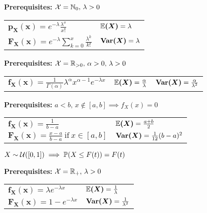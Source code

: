 \begin{ddefinition*}
  \textbf{Prerequisites:} \(\operatorname{\mathcal{X}} = \mathbb{N}_0, \, \lambda > 0\) \\
  \begin{tabularx}{\linewidth}{@{}ll@{}}
    \(\bm{p_X(x)} = e^{-\lambda}\frac{\lambda^x}{x!}\) & \(\bm{\mathbb{E}(X)} = \lambda\) \\
    \(\bm{F_X(x)} = e^{-\lambda} \sum\limits_{k=0}^x \frac{\lambda^k}{k!}\) & \(\bm{\Var(X)} = \lambda\)
  \end{tabularx}
\end{ddefinition*}

\begin{cdefinition*}
  \textbf{Prerequisites:} \(\operatorname{\mathcal{X}} = \mathbb{R}_{>0}, \, \alpha > 0, \, \lambda > 0\) \\
  \begin{tabularx}{\linewidth}{@{}lll@{}}
    \(\bm{f_X(x)} = \frac{1}{\Gamma(\alpha)} \lambda^\alpha x^{\alpha - 1}e^{-\lambda x}\) & \(\bm{\mathbb{E}(X)} = \frac{\alpha}{\lambda}\) & \(\bm{\Var(X)} = \frac{\alpha}{\lambda^2}\)
  \end{tabularx}
\end{cdefinition*}

\begin{cdefinition*}
  \textbf{Prerequisites:} \(a < b, \, x \notin [a, b] \implies f_X(x) = 0\) \\
  \begin{tabularx}{\linewidth}{@{}ll@{}}
    \(\bm{f_X(x)} = \frac{1}{b-a}\) & \(\bm{\mathbb{E}(X)} = \frac{a + b}{2}\) \\
    \(\bm{F_X(x)} = \frac{x - a}{b - a} \ \text{if} \ x \in [a, b]\) & \(\bm{\Var(X)} = \frac{1}{12}(b - a)^2\)
  \end{tabularx}
\end{cdefinition*}

\begin{lemma}
  \(X \sim \operatorname{\mathcal{U}}([0, 1]) \implies \mathbb{P}(X \leq F(t)) = F(t)\)
\end{lemma}

\begin{cdefinition*}
  \textbf{Prerequisites:} \(\operatorname{\mathcal{X}} = \mathbb{R}_+, \, \lambda > 0\) \\
  \begin{tabularx}{\linewidth}{@{}ll@{}}
    \(\bm{f_X(x)} = \lambda e^{-\lambda x}\) & \(\bm{\mathbb{E}(X)} = \frac{1}{\lambda}\) \\
    \(\bm{F_X(x)} = 1 - e^{-\lambda x}\) & \(\bm{\Var(X)} = \frac{1}{\lambda^2}\)
  \end{tabularx}
\end{cdefinition*}

